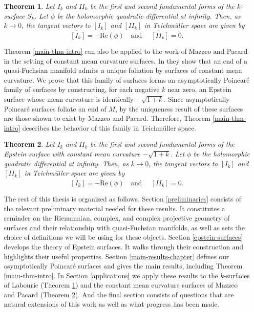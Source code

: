 \documentclass{amsart}
\newtheorem{bigthm}{Theorem}
\newcommand{\two}{I\!\!I}
\begin{document}
\begin{bigthm} \label{k-surfaces-intro}
Let $I_k$ and $\two_k$ be the first and second fundamental forms of the $k$-surface $S_k$. 
Let $\phi$ be the holomorphic quadratic differential at infinity. 
Then, as $k \to 0$, the tangent vectors to $[I_k]$ and $[\two_k]$ in Teichm\"uller space are given by 
\[
  \dot{[I_k]}= - \mathrm{Re}(\phi) \quad \text{and } \quad \dot{[\two_k]} = 0.
\]
\end{bigthm}

Theorem \ref{main-thm-intro} can also be applied to the work of Mazzeo and Pacard in the setting of constant mean curvature surfaces.
In \cite{mazzeo-pacard2011} they show that an end of a quasi-Fuchsian manifold admits a unique foliation by surfaces of constant mean curvature. 
We prove that this family of surfaces forms an asymptotically Poincar\'e family of surfaces by constructing, for each negative $k$ near zero, an Epstein surface whose mean curvature is identically $-\sqrt{1+k}$.
Since asymptotically Poincar\'e surfaces foliate an end of $M$, by the uniqueness result of \cite{mazzeo-pacard2011} these surfaces are those shown to exist by Mazzeo and Pacard.
Therefore, Theorem \ref{main-thm-intro} describes the behavior of this family in Teichm\"uller space.  

\begin{bigthm} \label{cmc-intro}
Let $I_k$ and $\two_k$ be the first and second fundamental forms of the Epstein surface with constant mean curvature $-\sqrt{1+k}$.
Let $\phi$ be the holomorphic quadratic differential at infinity. 
Then, as $k \to 0$, the tangent vectors to $[I_k]$ and $[\two_k]$ in Teichm\"uller space are given by 
\[
  \dot{[I_k]}= - \mathrm{Re}(\phi) \quad \text{and } \quad \dot{[\two_k]} = 0.
\]
\end{bigthm}

The rest of this thesis is organized as follows. 
Section \ref{preliminaries} consists of the relevant preliminary material needed for these results. 
It constitutes a reminder on the Riemannian, complex, and complex projective geometry of surfaces and their relationship with quasi-Fuchsian manifolds, as well as sets the choice of definitions we will be using for these objects. 
Section \ref{epstein-surfaces} develops the theory of Epstein surfaces.
It walks through their construction and highlights their useful properties. 
Section \ref{main-results-chapter} defines our asymptotically Poincar\'e surfaces and gives the main results, including Theorem \ref{main-thm-intro}.
In Section \ref{applications} we apply these results to the $k$-surfaces of Labourie (Theorem \ref{k-surfaces-intro}) and the constant mean curvature surfaces of Mazzeo and Pacard (Theorem \ref{cmc-intro}). 
And the final section consists of questions that are natural extensions of this work as well as what progress has been made.
\end{document}
